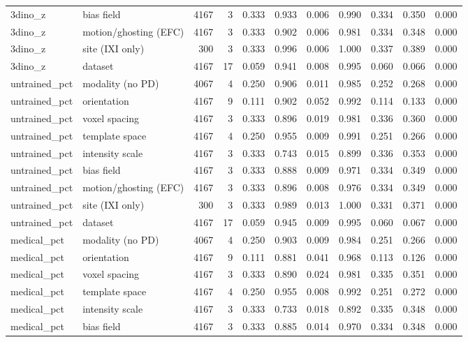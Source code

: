 \begin{tabular}{llrrrrrrrrr}
3dino\_z & bias field & 4167 & 3 & 0.333 & 0.933 & 0.006 & 0.990 & 0.334 & 0.350 & 0.000 \\
3dino\_z & motion/ghosting (EFC) & 4167 & 3 & 0.333 & 0.902 & 0.006 & 0.981 & 0.334 & 0.348 & 0.000 \\
3dino\_z & site (IXI only) & 300 & 3 & 0.333 & 0.996 & 0.006 & 1.000 & 0.337 & 0.389 & 0.000 \\
3dino\_z & dataset & 4167 & 17 & 0.059 & 0.941 & 0.008 & 0.995 & 0.060 & 0.066 & 0.000 \\
untrained\_pct & modality (no PD) & 4067 & 4 & 0.250 & 0.906 & 0.011 & 0.985 & 0.252 & 0.268 & 0.000 \\
untrained\_pct & orientation & 4167 & 9 & 0.111 & 0.902 & 0.052 & 0.992 & 0.114 & 0.133 & 0.000 \\
untrained\_pct & voxel spacing & 4167 & 3 & 0.333 & 0.896 & 0.019 & 0.981 & 0.336 & 0.360 & 0.000 \\
untrained\_pct & template space & 4167 & 4 & 0.250 & 0.955 & 0.009 & 0.991 & 0.251 & 0.266 & 0.000 \\
untrained\_pct & intensity scale & 4167 & 3 & 0.333 & 0.743 & 0.015 & 0.899 & 0.336 & 0.353 & 0.000 \\
untrained\_pct & bias field & 4167 & 3 & 0.333 & 0.888 & 0.009 & 0.971 & 0.334 & 0.349 & 0.000 \\
untrained\_pct & motion/ghosting (EFC) & 4167 & 3 & 0.333 & 0.896 & 0.008 & 0.976 & 0.334 & 0.349 & 0.000 \\
untrained\_pct & site (IXI only) & 300 & 3 & 0.333 & 0.989 & 0.013 & 1.000 & 0.331 & 0.371 & 0.000 \\
untrained\_pct & dataset & 4167 & 17 & 0.059 & 0.945 & 0.009 & 0.995 & 0.060 & 0.067 & 0.000 \\
medical\_pct & modality (no PD) & 4067 & 4 & 0.250 & 0.903 & 0.009 & 0.984 & 0.251 & 0.266 & 0.000 \\
medical\_pct & orientation & 4167 & 9 & 0.111 & 0.881 & 0.041 & 0.968 & 0.113 & 0.126 & 0.000 \\
medical\_pct & voxel spacing & 4167 & 3 & 0.333 & 0.890 & 0.024 & 0.981 & 0.335 & 0.351 & 0.000 \\
medical\_pct & template space & 4167 & 4 & 0.250 & 0.955 & 0.008 & 0.992 & 0.251 & 0.272 & 0.000 \\
medical\_pct & intensity scale & 4167 & 3 & 0.333 & 0.733 & 0.018 & 0.892 & 0.335 & 0.348 & 0.000 \\
medical\_pct & bias field & 4167 & 3 & 0.333 & 0.885 & 0.014 & 0.970 & 0.334 & 0.348 & 0.000 \\

\end{tabular}

